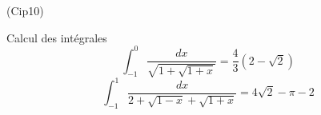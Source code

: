 \begin{tiny}(Cip10)\end{tiny}
Calcul des intégrales
\begin{displaymath}
\int_{-1}^{0}\frac{dx}{\sqrt{1+\sqrt{1+x}}} =
\frac{4}{3}(2-\sqrt{2}) 
\end{displaymath}
\begin{displaymath}
\int_{-1}^{1}\frac{dx}{2+\sqrt{1-x}+\sqrt{1+x}} =
4\sqrt{2}-\pi-2 
\end{displaymath}